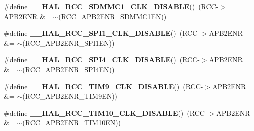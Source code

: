 \begin{DoxyCompactItemize}
\item 
\mbox{\label{group___r_c_c_ex___peripheral___clock___enable___disable_gab94e29d67ee313b4fbdbb491114a412e}} 
\#define {\bfseries \+\_\+\+\_\+\+H\+A\+L\+\_\+\+R\+C\+C\+\_\+\+S\+D\+M\+M\+C1\+\_\+\+C\+L\+K\+\_\+\+D\+I\+S\+A\+B\+LE}()~(R\+CC-\/$>$A\+P\+B2\+E\+NR \&= $\sim$(R\+C\+C\+\_\+\+A\+P\+B2\+E\+N\+R\+\_\+\+S\+D\+M\+M\+C1\+EN))
\item 
\mbox{\label{group___r_c_c_ex___peripheral___clock___enable___disable_gaf2ccb5c6b63a60deb6463cbc629c10fe}} 
\#define {\bfseries \+\_\+\+\_\+\+H\+A\+L\+\_\+\+R\+C\+C\+\_\+\+S\+P\+I1\+\_\+\+C\+L\+K\+\_\+\+D\+I\+S\+A\+B\+LE}()~(R\+CC-\/$>$A\+P\+B2\+E\+NR \&= $\sim$(R\+C\+C\+\_\+\+A\+P\+B2\+E\+N\+R\+\_\+\+S\+P\+I1\+EN))
\item 
\mbox{\label{group___r_c_c_ex___peripheral___clock___enable___disable_ga85678767f2c727a545b1095d9ef69a67}} 
\#define {\bfseries \+\_\+\+\_\+\+H\+A\+L\+\_\+\+R\+C\+C\+\_\+\+S\+P\+I4\+\_\+\+C\+L\+K\+\_\+\+D\+I\+S\+A\+B\+LE}()~(R\+CC-\/$>$A\+P\+B2\+E\+NR \&= $\sim$(R\+C\+C\+\_\+\+A\+P\+B2\+E\+N\+R\+\_\+\+S\+P\+I4\+EN))
\item 
\mbox{\label{group___r_c_c_ex___peripheral___clock___enable___disable_ga6c858a3c7df429051fe4459a8a22da43}} 
\#define {\bfseries \+\_\+\+\_\+\+H\+A\+L\+\_\+\+R\+C\+C\+\_\+\+T\+I\+M9\+\_\+\+C\+L\+K\+\_\+\+D\+I\+S\+A\+B\+LE}()~(R\+CC-\/$>$A\+P\+B2\+E\+NR \&= $\sim$(R\+C\+C\+\_\+\+A\+P\+B2\+E\+N\+R\+\_\+\+T\+I\+M9\+EN))
\item 
\mbox{\label{group___r_c_c_ex___peripheral___clock___enable___disable_ga33f3e5d6b2c337d84ae550b701e37455}} 
\#define {\bfseries \+\_\+\+\_\+\+H\+A\+L\+\_\+\+R\+C\+C\+\_\+\+T\+I\+M10\+\_\+\+C\+L\+K\+\_\+\+D\+I\+S\+A\+B\+LE}()~(R\+CC-\/$>$A\+P\+B2\+E\+NR \&= $\sim$(R\+C\+C\+\_\+\+A\+P\+B2\+E\+N\+R\+\_\+\+T\+I\+M10\+EN))
\item 
\mbox{\label{group___r_c_c_ex___peripheral___clock___enable___disable_ga2ea675ace35a7a536c9f4cec522f28bc}} 

\end{DoxyCompactItemize}
